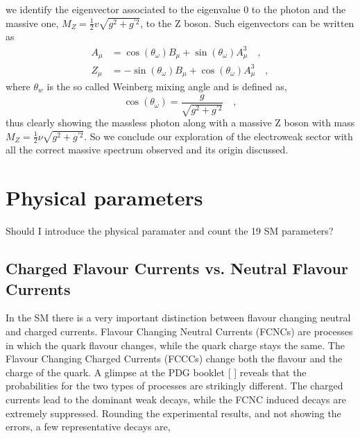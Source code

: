 %
we identify the eigenvector associated to the eigenvalue 0 to the photon and the massive one, $ M_Z =  \frac{1}{2} v \sqrt{g^2 + g^{\prime 2}} $, to the Z boson. Such eigenvectors can be written as
%
\begin{align}
A_\mu &=\cos(\theta_\omega) B_\mu + \sin(\theta_\omega) A_\mu^3 \quad ,  \\  
Z_\mu & =- \sin(\theta_\omega) B_\mu + \cos(\theta_\omega) A_\mu^3 \quad , 
\end{align}
%
where $\theta_w$ is the so called Weinberg mixing angle and is defined as, 
\begin{equation}
\cos(\theta_\omega)=\frac{g}{ \sqrt{g^2 + g^{\prime 2}}} \quad , 
\end{equation}
thus clearly showing the massless photon along with a massive Z boson with mass $M_Z= \frac{1}{2} \nu \sqrt{g^2 + g^{\prime 2}} $. 
%
So we conclude our exploration of the electroweak sector with all the correct massive spectrum observed and its origin discussed.

 

{\color{gray} \section{Physical parameters}
Should I introduce the physical paramater and count the 19 SM parameters? }


\subsection{Charged Flavour Currents vs. Neutral Flavour Currents}

In the SM there is a very important distinction between flavour changing neutral and charged currents. Flavour Changing Neutral Currents (FCNCs) are processes in which the quark flavour changes, while the quark charge stays the same. The Flavour Changing Charged Currents (FCCCs) change both the flavour and the charge of the quark. A glimpse at the PDG booklet [
] reveals that the probabilities for the two types of processes are strikingly different.  The charged currents lead to the dominant weak decays, while the FCNC induced decays are extremely suppressed. Rounding the experimental results, and not showing the errors, a few representative decays are, 

